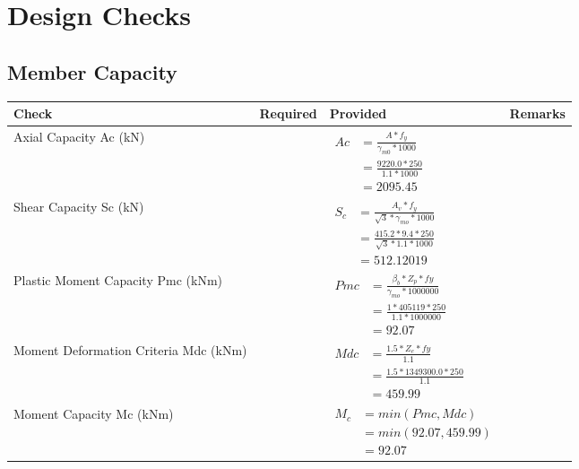 \documentclass{article}%
\begin{document}
%
%
\newpage%
\section{Design Checks}%
\label{sec:DesignChecks}%
\subsection{Member Capacity}%
\label{subsec:MemberCapacity}%
\renewcommand{\arraystretch}{1.2}%
\begin{longtable}{|p{4cm}|p{5cm}|p{5.5cm}|p{1.5cm}|}%
\hline%
\rowcolor{OsdagGreen}%
Check&Required&Provided&Remarks\\%
\hline%
\endhead%
\hline%
Axial Capacity Ac (kN)&&$\begin{aligned} Ac &=\frac{A*f_y}{\gamma_{m0} *1000}\\ &=\frac{9220.0*250}{1.1* 1000}\\ &=2095.45\end{aligned}$&\\%
\hline%
Shear Capacity Sc (kN)&&$\begin{aligned} S_c &= \frac{A_v*f_y}{\sqrt{3}*\gamma_{mo} *1000}\\ &=\frac{415.2*9.4*250}{\sqrt{3}*1.1 *1000}\\ &=512.12019\end{aligned}$&\\%
\hline%
Plastic Moment Capacity Pmc (kNm)&&$\begin{aligned} Pmc &= \frac{\beta_b * Z_p *fy}{\gamma_{mo} * 1000000}\\ &=\frac{1*405119*250}{1.1 * 1000000}\\ &=92.07\end{aligned}$&\\%
\hline%
Moment Deformation Criteria Mdc (kNm)&&$\begin{aligned} Mdc &= \frac{1.5 *Z_e *fy}{1.1}\\ &= \frac{1.5 *1349300.0*250}{1.1}\\ &= 459.99\end{aligned}$&\\%
\hline%
Moment Capacity Mc (kNm)&&$\begin{aligned} M_c &= min(Pmc,Mdc)\\ &=min(92.07,459.99)\\ &=92.07\end{aligned}$&\\%
\hline%
\end{longtable}
\end{document}
